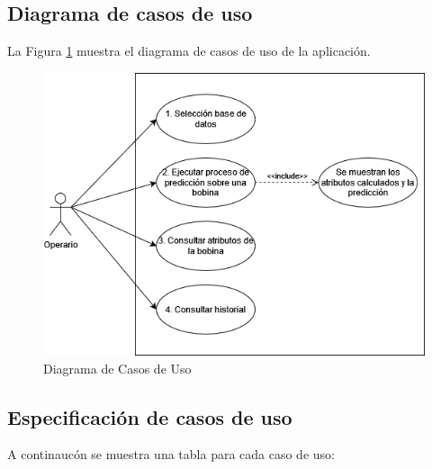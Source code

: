 \newpage
\subsection{Diagrama de casos de uso}
La Figura \ref{f:casus} muestra el diagrama de casos de uso de la aplicación.

\begin{figure}[h]
 \centering
  \includegraphics[width=1\textwidth]{img/casosUso.png}
 \caption{Diagrama de Casos de Uso}
 \label{f:casus}
\end{figure}

\newpage
\subsection{Especificación de casos de uso}
A continaucón se muestra una tabla para cada caso de uso:

